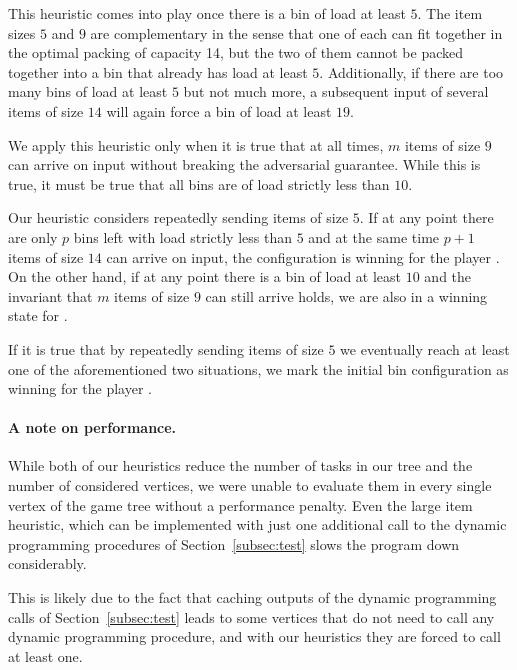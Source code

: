 This heuristic comes into play once there is a bin of load at least
$5$. The item sizes $5$ and $9$ are complementary in the sense that
one of each can fit together in the optimal packing of capacity 14,
but the two of them cannot be packed together into a bin that already
has load at least $5$. Additionally, if there are too many bins of
load at least $5$ but not much more, a subsequent input of several
items of size $14$ will again force a bin of load at least $19$.

We apply this heuristic only when it is true that at all times, $m$
items of size $9$ can arrive on input without breaking the adversarial
guarantee. While this is true, it must be true that all bins are of
load strictly less than $10$.

Our heuristic considers repeatedly sending items of size $5$. If at
any point there are only $p$ bins left with load strictly less than
$5$ and at the same time $p+1$ items of size $14$ can arrive on input,
the configuration is winning for the player \adversary. On the other
hand, if at any point there is a bin of load at least $10$ and the
invariant that $m$ items of size $9$ can still arrive holds, we are
also in a winning state for \adversary.

If it is true that by repeatedly sending items of size $5$ we
eventually reach at least one of the aforementioned two situations,
we mark the initial bin configuration as winning for the player
\adversary.

\paragraph{A note on performance.} While both of our heuristics reduce
the number of tasks in our tree and the number of considered vertices,
we were unable to evaluate them in every single vertex of the game
tree without a performance penalty. Even the large item heuristic,
which can be implemented with just one additional call to the dynamic
programming procedures of Section~\ref{subsec:test} slows the program
down considerably.

This is likely due to the fact that caching outputs of the dynamic
programming calls of Section~\ref{subsec:test} leads to some vertices
that do not need to call any dynamic programming procedure, and with
our heuristics they are forced to call at least one.

